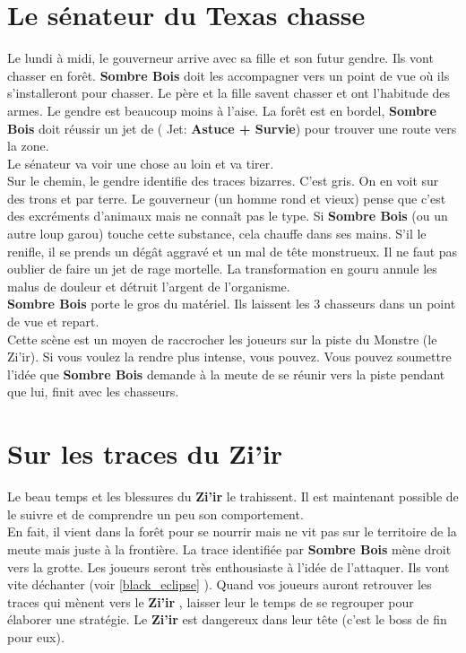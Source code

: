 \documentclass[oneside,12pt]{book}
\newcommand\roll[1]{
( Jet: \textbf{#1})
}
\newcommand{\Leonard}{\textbf{Sombre Bois} }
\newcommand{\Thomas}{\textbf{Zi'ir} }
\begin{document}
\begin{flushleft}
\section{Le sénateur du Texas chasse}
Le lundi à midi, le gouverneur arrive avec sa fille et son futur gendre. Ils vont chasser en forêt. \Leonard doit les accompagner vers un point de vue où ils s'installeront pour chasser. Le père et la fille savent chasser et ont l'habitude des armes. Le gendre est beaucoup moins à l'aise. 
La forêt est en bordel, \Leonard doit réussir un jet de \roll{Astuce + Survie} pour trouver une route vers la zone. \\
Le sénateur va voir une chose au loin et va tirer. \\
Sur le chemin, le gendre identifie des traces bizarres. C'est gris. On en voit sur des trons et par terre. Le gouverneur (un homme rond et vieux) pense que c'est des excréments d'animaux mais ne connaît pas le type. Si \Leonard (ou un autre loup garou) touche cette substance, cela chauffe dans ses mains. S'il le renifle, il se prends un dégât aggravé et un mal de tête monstrueux. Il ne faut pas oublier de faire un jet de rage mortelle. La transformation en gouru annule les malus de douleur et détruit l'argent de l'organisme.\\
\Leonard porte le gros du matériel. Ils laissent les 3 chasseurs dans un point de vue et repart.\\
Cette scène est un moyen de raccrocher les joueurs sur la piste du Monstre (le Zi'ir). Si vous voulez la rendre plus intense, vous pouvez. Vous pouvez soumettre l'idée que \Leonard demande à la meute de se réunir vers la piste pendant que lui, finit avec les chasseurs. 


\section{Sur les traces du \Thomas}
Le beau temps et les blessures du \Thomas le trahissent. Il est maintenant possible de le suivre et de comprendre un peu son comportement.\\
En fait, il vient dans la forêt pour se nourrir mais ne vit pas sur le territoire de la meute mais juste à la frontière. La trace identifiée par \Leonard mène droit vers la grotte. 
Les joueurs seront très enthousiaste à l'idée de l'attaquer.
Ils vont vite déchanter (voir \ref{black_eclipse} ). 
Quand vos joueurs auront retrouver les traces qui mènent vers le \Thomas, laisser leur le temps de se regrouper pour élaborer une stratégie. 
Le \Thomas est dangereux dans leur tête (c'est le boss de fin pour eux). 




\end{flushleft}
\end{document}
